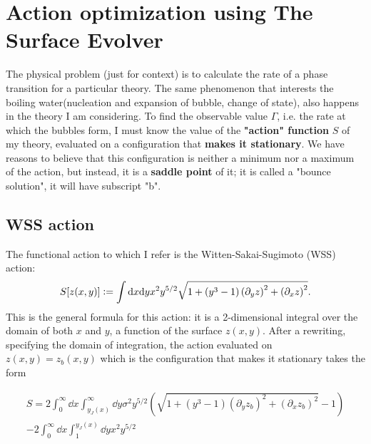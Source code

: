 \documentclass[binding=0.6cm, a4paper]{unifith}
\theoremstyle{plain}
\theoremstyle{definition}
\newcommand{\deq}{\vcentcolon=}
\begin{document}


\chapter*{Action optimization using The Surface Evolver}

The physical problem (just for context) is to calculate the rate of a phase transition for a particular theory. The same phenomenon that interests the boiling water(nucleation and expansion of bubble, change of state), also happens in the theory I am considering. To find the observable value $\Gamma$, i.e. the rate at which the bubbles form, I must know the value of the \textbf{"action" function} $S$ of my theory, evaluated on a configuration that \textbf{makes it stationary}. We have reasons to believe that this configuration is neither a minimum nor a maximum of the action, but instead, it is a \textbf{saddle point} of it; it is called a "bounce solution", it will have subscript "b".

\section*{WSS action}

The functional action to which I refer is the Witten-Sakai-Sugimoto (WSS) action: 
\begin{equation}
    S[z(x,y)]\deq \int \dd x\dd y x^2 y^{5/2} \sqrt{1+\left(y^3-1\right) \left(\partial_y z\right)^2+\left(\partial_x z\right)^2}.\label{Stilde}
\end{equation}
This is the general formula for this action: it is a 2-dimensional integral over the domain of both $x$ and $y$, a function of the surface $z(x,y)$. After a rewriting, specifying the domain of integration, the action evaluated on $z(x,y)=z_b(x,y)$ which is the configuration that makes it stationary takes the form

\begin{multline}\label{DELTASTILDE}
S=2\int_0^\infty \dd x \int_{y_J(x)}^\infty\dd y \sigma^2 y^{5/2}\left( \sqrt{1+\left(y^3-1\right) \left(\partial_y z_b\right)^2+\left(\partial_x z_b\right)^2}-1\right)\\
-2\int_0^\infty \dd x \int_1^{y_J(x)}\dd y x^2 y^{5/2}
\end{multline}
\end{document}
